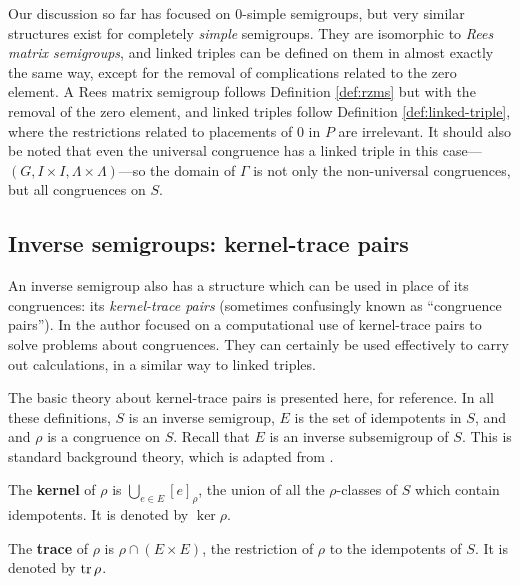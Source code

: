 Our discussion so far has focused on 0-simple semigroups, but very similar
structures exist for completely \textit{simple} semigroups.  They are isomorphic
to \textit{Rees matrix semigroups}, and linked triples can be defined on them in
almost exactly the same way, except for the removal of complications related to
the zero element.  A Rees matrix semigroup follows Definition \ref{def:rzms} but
with the removal of the zero element, and linked triples follow Definition
\ref{def:linked-triple}, where the restrictions related to placements of $0$ in
$P$ are irrelevant.  It should also be noted that even the universal congruence
has a linked triple in this
case---$(G, I \times I, \Lambda \times \Lambda)$---so the domain of $\Gamma$ is
not only the non-universal congruences, but all congruences on $S$.

\subsection{Inverse semigroups: kernel-trace pairs}
\label{sec:kertr}

An inverse semigroup also has a structure which can be used in place of its
congruences: its \textit{kernel-trace pairs} (sometimes confusingly known as
``congruence pairs'').  In \cite[Chapter 5]{mtorpey_msc} the author focused on a
computational use of kernel-trace pairs to solve problems about congruences.
They can certainly be used effectively to carry out calculations, in a similar
way to linked triples.

The basic theory about kernel-trace pairs is presented here, for reference.  In
all these definitions, $S$ is an inverse semigroup, $E$ is the set of
idempotents in $S$, and and $\rho$ is a congruence on $S$.  Recall that $E$ is
an inverse subsemigroup of $S$.  This is standard background theory, which is
adapted from \cite[\S 5.3]{howie}.

\begin{definition}
  \label{def:kernel}
  The \textbf{kernel} of $\rho$ is $\bigcup_{e \in E} [e]_\rho$, the union of
  all the $\rho$-classes of $S$ which contain idempotents.  It is denoted by
  $\ker\rho$.
\end{definition}

\begin{definition}
  \label{def:trace}
  The \textbf{trace} of $\rho$ is $\rho \cap (E \times E)$, the restriction of
  $\rho$ to the idempotents of $S$.  It is denoted by $\operatorname{tr}\rho$.
\end{definition}


